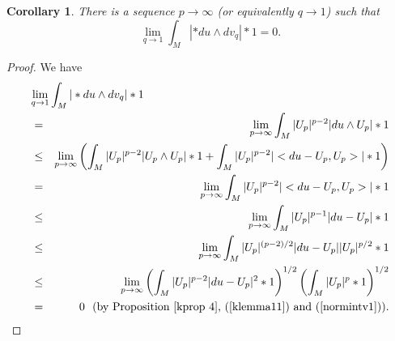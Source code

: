 \documentclass{ip-journal}
\newtheorem{corollary}[theorem]{Corollary}
\theoremstyle{definition}
\numberwithin{equation}{section}
\begin{document}
\begin{corollary} \label{currentsupportfiber} There is a sequence $p \rightarrow \infty$ (or equivalently $q \rightarrow 1$) such that 
\[
\lim_{q\rightarrow 1} \int_M |*du \wedge dv_q|*1 = 0.
\]
\end{corollary}
\begin{proof}
We have
\begin{eqnarray*}
\lefteqn{\lim_{q\rightarrow 1} \int_M |*du \wedge dv_q|*1}\\
&=&\lim_{p\rightarrow \infty}\int_M |U_p|^{p-2} |du \wedge U_p| *1\\
&\leq& \lim_{p\rightarrow \infty} \left(\int_M |U_p|^{p-2}| U_p \wedge U_p| *1
+\int_M |U_p|^{p-2}|<du-U_p, U_p>| *1\right)\\
&=& \lim_{p\rightarrow \infty}\int_M |U_p|^{p-2}|<du-U_p, U_p>| *1\\
&\leq&\lim_{p\rightarrow \infty} \int_M |U_p|^{p-1}|du-U_p| *1\\
&\leq&\lim_{p\rightarrow \infty} \int_M |U_p|^{(p-2)/2}|du-U_p||U_p|^{p/2} *1\\
&\leq&\lim_{p\rightarrow \infty} \left(\int_M |U_p|^{p-2}|du-U_p|^2*1\right)^{1/2} \left(\int_M |U_p|^p *1\right)^{1/2}\\
&=& 0 \ \ \mbox{(by Proposition~\ref{kprop 4}, (\ref{klemma11}) and  (\ref{normintv1}))}.
\end{eqnarray*}

\end{proof}
\end{document}
